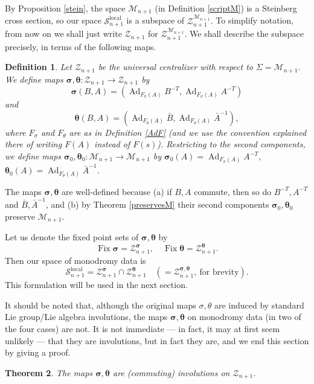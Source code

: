\documentclass[a4paper,12pt,leqno]{amsart}
\numberwithin{equation}{section}
\theoremstyle{plain}
\newtheorem{theorem}{Theorem}[section]
\newtheorem{definition}[theorem]{Definition}
\theoremstyle{definition}
\newcommand{\si}{\sigma}
\renewcommand{\th}{\theta}
\DeclareMathOperator{\Fix}{Fix}
\DeclareMathOperator{\Ad}{Ad}
\newcommand{\cS}{\mathcal{S}}
\newcommand{\cM}{\mathcal{M}}
\newcommand{\cZ}{\mathcal{Z}}
\newcommand{\bsi}{\boldsymbol\si}
\newcommand{\bth}{\boldsymbol\th}
\begin{document}
By Proposition \ref{stein},
the space $\cM_{n+1}$ (in Definition \ref{scriptM})
is a Steinberg cross section, so
our space $\cS_{n+1}^{\text{local}}$ is a subspace of
$\cZ_{n+1}^{\cM_{n+1}}$. To simplify notation, from now on we shall just write
$\cZ_{n+1}$ for $\cZ_{n+1}^{\cM_{n+1}}$.
We shall describe the subspace precisely,  in terms of the following maps.

\begin{definition}\label{morphism} Let $\cZ_{n+1}$ be the
universal centralizer with respect to $\Sigma=\cM_{n+1}$.
We define maps $\bsi,\bth:\cZ_{n+1}\to \cZ_{n+1}$ by
\[
\bsi(B,A)= (\Ad_{F_\si(A)}  B^{-T}, \Ad_{F_\si(A)}  A^{-T})
\]
and
\[
\bth(B,A)= (\Ad_{F_\th(A)} \bar B, \Ad_{F_\th(A)} \bar A^{-1}),
\]
where
$F_\si$ and $F_\th$ are as in Definition \ref{AdF} (and we use the convention explained there
of writing $F(A)$ instead of $F(s)$).
Restricting to the second components, we define maps $\bsi_0,\bth_0:\cM_{n+1}\to \cM_{n+1}$ by
$\bsi_0(A)=\Ad_{F_\si(A)}  A^{-T}$,
$\bth_0(A)=\Ad_{F_\th(A)} \bar A^{-1}$.
\end{definition}

The maps $\bsi,\bth$ are well-defined because
(a)  if $B,A$ commute,
then so do  $B^{-T},A^{-T}$ and  $\bar B,\bar A^{-1}$, and
(b) by Theorem \ref{preservesM}
their second components $\bsi_0,\bth_0$ preserve $\cM_{n+1}$.

Let us denote the fixed point sets of $\bsi,\bth$ by
\[
\Fix \bsi = \cZ_{n+1}^{\bsi},\quad
\Fix \bth = \cZ_{n+1}^{\bth}.
\]
Then our space of monodromy data is
\[
\cS_{n+1}^{\text{local}}=\cZ_{n+1}^{\bsi} \cap \cZ_{n+1}^{\bth}
\quad (=\cZ_{n+1}^{\bsi,\bth}, \ \text{for brevity} ).
\]
This formulation will be used in the next section.

It should be noted that, although the original maps $\si,\th$
are induced by standard Lie group/Lie algebra involutions,
the maps $\bsi,\bth$ on monodromy data (in two of the four cases) are not. It is not immediate
--- in fact, it may at first seem unlikely --- that they are involutions, but in fact they are, and
we end this section by giving a proof.

\begin{theorem}\label{comminv}
The maps $\bsi,\bth$ are (commuting) involutions on $\cZ_{n+1}$.
\end{theorem}
\end{document}
